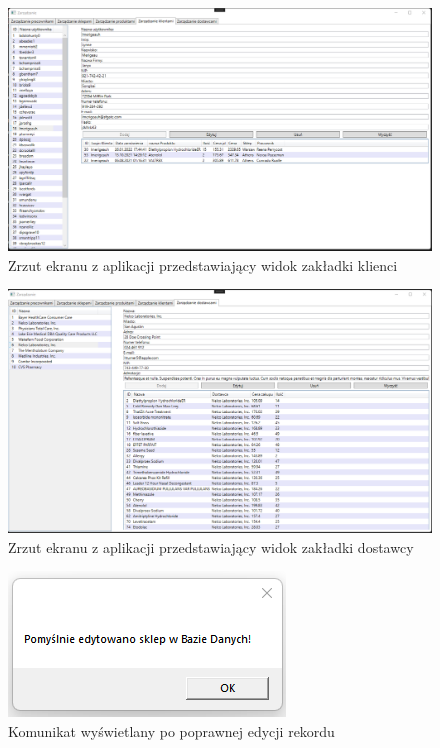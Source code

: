 \documentclass[12pt,a4paper]{article}
\begin{document}
            \begin{figure}[H]
                \centering
                \includegraphics[scale=0.4]{images/kienci.png}
                \caption{Zrzut ekranu z aplikacji przedstawiający widok zakładki klienci}
            \end{figure}
            
            \begin{figure}[H]
                \centering
                \includegraphics[scale=0.4]{images/dostawy.png}
                \caption{Zrzut ekranu z aplikacji przedstawiający widok zakładki dostawcy}
            \end{figure}
            
            \begin{figure}[H]
                \centering
                \includegraphics{images/komunikat1.png}
                \caption{Komunikat wyświetlany po poprawnej edycji rekordu}
            \end{figure}
            
\end{document}
